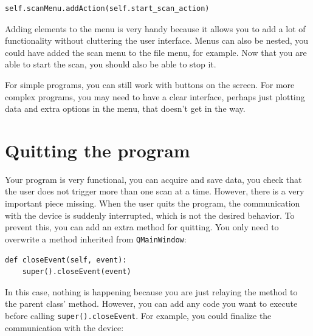 \begin{verbatim}
self.scanMenu.addAction(self.start_scan_action)
\end{verbatim}


Adding elements to the menu is very handy because it allows you to add a
lot of functionality without cluttering the user interface. Menus can
also be nested, you could have added the scan menu to the file menu, for
example. Now that you are able to start the scan, you should also be
able to stop it.


For simple programs, you can still work with buttons on the screen. For
more complex programs, you may need to have a clear interface, perhaps
just plotting data and extra options in the menu, that doesn't get in
the way.

\section{Quitting the program}\label{quitting-theprogram}
Your program is very functional, you can acquire and save data, you
check that the user does not trigger more than one scan at a time.
However, there is a very important piece missing. When the user quits
the program, the communication with the device is suddenly interrupted,
which is not the desired behavior. To prevent this, you can add an extra
method for quitting. You only need to overwrite a method inherited from
\texttt{QMainWindow}:

\begin{verbatim}
def closeEvent(self, event):
    super().closeEvent(event)
\end{verbatim}

In this case, nothing is happening because you are just relaying the
method to the parent class' method. However, you can add any code you
want to execute before calling \texttt{super().closeEvent}. For example,
you could finalize the communication with the device:

